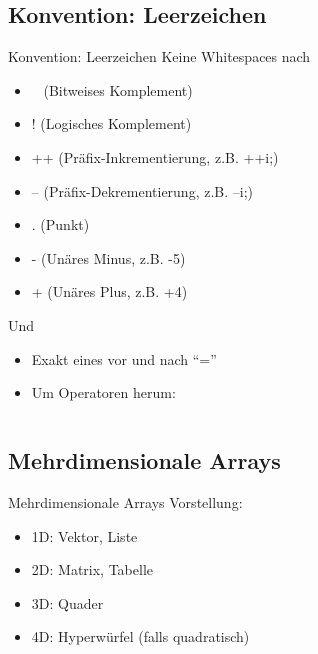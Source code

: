 \documentclass[usepdftitle=false,hyperref={pdfpagelabels=false}]{beamer}
\begin{document}
\subsection{Konvention: Leerzeichen}
\begin{frame}{Konvention: Leerzeichen}
Keine Whitespaces nach
    \begin{itemize}
        \item ~ (Bitweises Komplement)
        \item ! (Logisches Komplement)
        \item ++ (Präfix-Inkrementierung, z.B. ++i;)
        \item -- (Präfix-Dekrementierung, z.B. --i;)
        \item . (Punkt)
        \item - (Unäres Minus, z.B. -5)
        \item + (Unäres Plus, z.B. +4)
    \end{itemize}
    Und
    \begin{itemize}
        \item Exakt eines vor und nach "`="'
        \item Um Operatoren herum:
    \end{itemize}

    \inputminted[linenos=false, numbersep=5pt, tabsize=4, fontsize=\small, firstline=20, lastline=24]{java}{singleLines.java}
\end{frame}

\subsection{Mehrdimensionale Arrays}
\begin{frame}{Mehrdimensionale Arrays}
    Vorstellung:
    \begin{itemize}
        \item 1D: Vektor, Liste
        \item 2D: Matrix, Tabelle
        \item 3D: Quader
        \item 4D: Hyperwürfel (falls quadratisch)
    \end{itemize}

    \inputminted[linenos=false, numbersep=5pt, tabsize=4, fontsize=\small, firstline=26, lastline=33]{java}{singleLines.java}
\end{frame}
\end{document}
